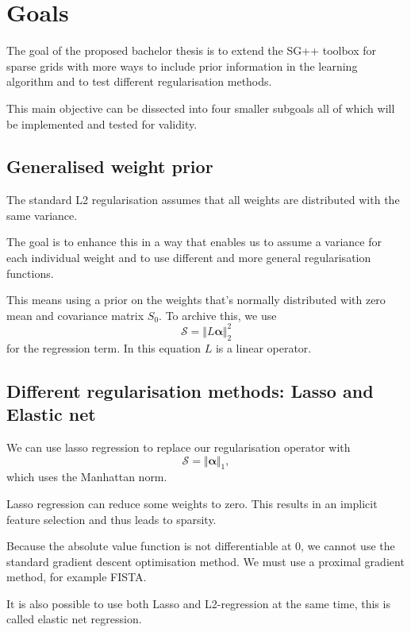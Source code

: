 \documentclass[11pt]{scrartcl}
\begin{document}
\section{Goals}
\label{sec:orgheadline6}
The goal of the proposed bachelor thesis is to extend the SG++ toolbox for sparse grids with more ways to include prior information
in the learning algorithm and to test different regularisation methods.

This main objective can be dissected into four smaller subgoals all of which will be implemented and tested for validity.

\subsection{Generalised weight prior}
\label{sec:orgheadline2}
The standard L2 regularisation assumes that all weights are distributed with the same variance. 

The goal is to enhance this in a way that enables us to assume a variance for
each individual weight and to use different and more general regularisation functions.

This means using a prior on the weights that's normally distributed with zero mean and covariance matrix \(S_0\).
To archive this, we use 
\begin{equation}
\mathcal{S} = \Vert L\bm{\alpha} \Vert_2^2
\end{equation}
for the regression term. In this equation \( L \) is a linear operator.

\subsection{Different regularisation methods: Lasso and Elastic net}
\label{sec:orgheadline3}
We can use lasso regression to replace our regularisation operator with 
\begin{equation}
\mathcal{S} = \Vert \bm{\alpha} \Vert_1,
\end{equation}
which uses the Manhattan norm.

Lasso regression can reduce some weights to zero. 
This results in an implicit feature selection and thus leads to sparsity.

Because the absolute value function is not differentiable at \(0\), we cannot use
the standard gradient descent optimisation method.
We must use a proximal gradient method, for example FISTA.

It is also possible to use both Lasso and L2-regression at the same time, this is called elastic net regression.
\end{document}
